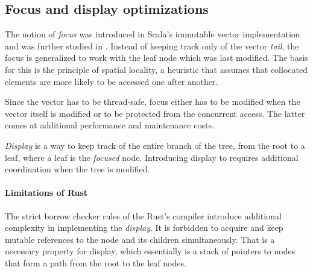 


\subsection{Focus and display optimizations}
The notion of \emph{focus} was introduced in Scala's immutable vector implementation and was further studied in \cite{rrb-vector-practical-general-purpose-im-sequence}. Instead of keeping track only of the vector \emph{tail}, the focus is generalized to work with the leaf node which was last modified. The basis for this is the principle of spatial locality, a heuristic that assumes that collocated elements are more likely to be accessed one after another.

Since the vector has to be thread-safe, focus either has to be modified when the vector itself is modified or to be protected from the concurrent access. The latter comes at additional performance and maintenance costs. 

\emph{Display} is a way to keep track of the entire branch of the tree, from the root to a leaf, where a leaf is the \emph{focused} node. Introducing display to \rrbtree{} requires additional coordination when the tree is modified. 

\paragraph{Limitations of Rust}
The strict borrow checker rules of the Rust's compiler introduce additional complexity in implementing the \emph{display}. It is forbidden to acquire and keep mutable references to the node and its children simultaneously. That is a necessary property for display, which essentially is a stack of pointers to nodes that form a path from the root to the leaf nodes. 

